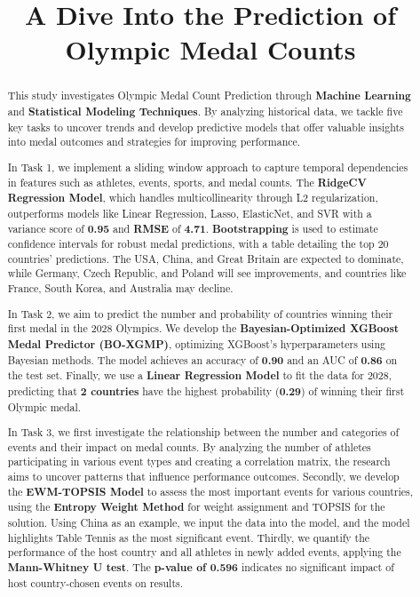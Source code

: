 \documentclass[12pt]{article}  %
\title{A Dive Into the Prediction of Olympic Medal Counts}  %
\begin{document}
\begin{abstract}
This study investigates Olympic Medal Count Prediction through \textbf{Machine Learning }and \textbf{Statistical Modeling Techniques}. By analyzing historical data, we tackle five key tasks to uncover trends and develop predictive models that offer valuable insights into medal outcomes and strategies for improving performance.

In Task 1, we implement a sliding window approach to capture temporal dependencies in features such as athletes, events, sports, and medal counts. The \textbf{RidgeCV Regression Model}, which handles multicollinearity through L2 regularization, outperforms models like Linear Regression, Lasso, ElasticNet, and SVR with a variance score of \textbf{0.95} and \textbf{RMSE} of \textbf{4.71}. \textbf{Bootstrapping} is used to estimate confidence intervals for robust medal predictions, with a table detailing the top 20 countries’ predictions. The USA, China, and Great Britain are expected to dominate, while Germany, Czech Republic, and Poland will see improvements, and countries like France, South Korea, and Australia may decline.

In Task 2, we aim to predict the number and probability of countries winning their first medal in the 2028 Olympics. We develop the \textbf{Bayesian-Optimized XGBoost Medal Predictor (BO-XGMP)}, optimizing XGBoost’s hyperparameters using Bayesian methods. The model achieves an accuracy of \textbf{0.90} and an AUC of \textbf{0.86} on the test set. Finally, we use a \textbf{Linear Regression Model} to fit the data for 2028, predicting that \textbf{2 countries} have the highest probability (\textbf{0.29}) of winning their first Olympic medal.

In Task 3, we first investigate the relationship between the number and categories of events and their impact on medal counts. By analyzing the number of athletes participating in various event types and creating a correlation matrix, the research aims to uncover patterns that influence performance outcomes. Secondly, we develop the \textbf{EWM-TOPSIS Model} to assess the most important events for various countries, using the \textbf{Entropy Weight Method} for weight assignment and TOPSIS for the solution. Using China as an example, we input the data into the model, and the model highlights Table Tennis as the most significant event. Thirdly, we quantify the performance of the host country and all athletes in newly added events, applying the \textbf{Mann-Whitney U test}. The \textbf{p-value of 0.596} indicates no significant impact of host country-chosen events on results.


\end{abstract}
\end{document}
